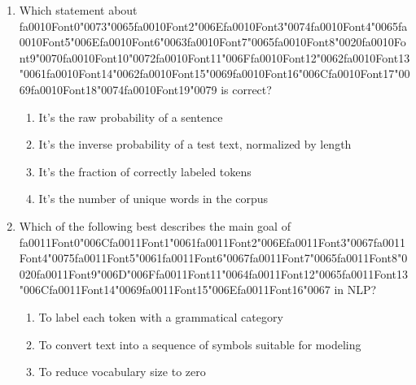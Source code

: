 \documentclass[12pt]{article}
\begin{document}
\begin{enumerate}[label=Q\arabic*.]
\begin{enumerate}[label=(\Alph*)]
\end{enumerate}
\item Which statement about {\csname fa0010Font0\endcsname\char"0073}{\char"0065}{\csname fa0010Font2\endcsname\char"006E}{\csname fa0010Font3\endcsname\char"0074}{\csname fa0010Font4\endcsname\char"0065}{\csname fa0010Font5\endcsname\char"006E}{\csname fa0010Font6\endcsname\char"0063}{\csname fa0010Font7\endcsname\char"0065}{\csname fa0010Font8\endcsname\char"0020}{\csname fa0010Font9\endcsname\char"0070}{\csname fa0010Font10\endcsname\char"0072}{\csname fa0010Font11\endcsname\char"006F}{\csname fa0010Font12\endcsname\char"0062}{\csname fa0010Font13\endcsname\char"0061}{\csname fa0010Font14\endcsname\char"0062}{\csname fa0010Font15\endcsname\char"0069}{\csname fa0010Font16\endcsname\char"006C}{\csname fa0010Font17\endcsname\char"0069}{\csname fa0010Font18\endcsname\char"0074}{\csname fa0010Font19\endcsname\char"0079} is correct?
\begin{enumerate}[label=(\Alph*)]
    \item It's the raw probability of a sentence
    \item It's the inverse probability of a test text, normalized by length
    \item It's the fraction of correctly labeled tokens
    \item It's the number of unique words in the corpus
\end{enumerate}
\item Which of the following best describes the main goal of {\csname fa0011Font0\endcsname\char"006C}{\csname fa0011Font1\endcsname\char"0061}{\csname fa0011Font2\endcsname\char"006E}{\csname fa0011Font3\endcsname\char"0067}{\csname fa0011Font4\endcsname\char"0075}{\csname fa0011Font5\endcsname\char"0061}{\csname fa0011Font6\endcsname\char"0067}{\csname fa0011Font7\endcsname\char"0065}{\csname fa0011Font8\endcsname\char"0020}{\csname fa0011Font9\endcsname\char"006D}{\char"006F}{\csname fa0011Font11\endcsname\char"0064}{\csname fa0011Font12\endcsname\char"0065}{\csname fa0011Font13\endcsname\char"006C}{\csname fa0011Font14\endcsname\char"0069}{\csname fa0011Font15\endcsname\char"006E}{\csname fa0011Font16\endcsname\char"0067} in NLP?
\begin{enumerate}[label=(\Alph*)]
    \item To label each token with a grammatical category
    \item To convert text into a sequence of symbols suitable for modeling
    \item To reduce vocabulary size to zero

\end{enumerate}
\end{enumerate}
\end{document}
